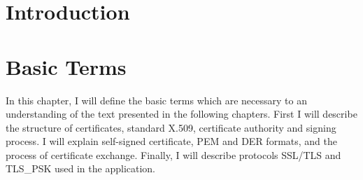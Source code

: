\documentclass[
  digital, %
  notable,   %
  lof,     %
  lot,     %
]{fithesis3}
\begin{document}
\chapter{Introduction}


\chapter{Basic Terms}
In this chapter, I will define the basic terms which are necessary to an understanding of the 
text presented in the following chapters. First %
I will describe the structure of certificates, standard X.509, certificate authority and 
signing process. I will explain self-signed certificate, PEM and DER formats, and the process 
of certificate exchange. Finally, I will describe protocols SSL/TLS and TLS\_PSK used in the 
application.
\end{document}
